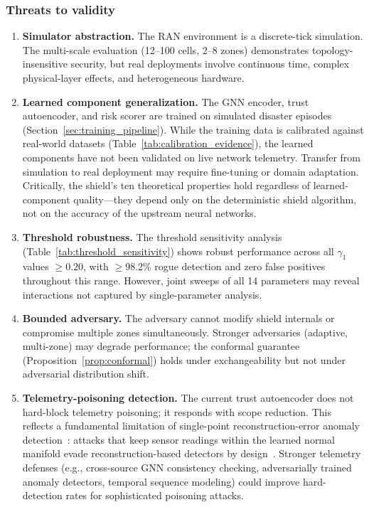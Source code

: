 \documentclass[10pt,journal,compsoc]{IEEEtran}
\begin{document}
\subsubsection{Threats to validity}
\begin{enumerate}
    \item \textbf{Simulator abstraction.}  The RAN environment is a discrete-tick simulation.  The multi-scale evaluation (12--100 cells, 2--8 zones) demonstrates topology-insensitive security, but real deployments involve continuous time, complex physical-layer effects, and heterogeneous hardware.
    \item \textbf{Learned component generalization.}  The GNN encoder, trust autoencoder, and risk scorer are trained on simulated disaster episodes (Section~\ref{sec:training_pipeline}).  While the training data is calibrated against real-world datasets (Table~\ref{tab:calibration_evidence}), the learned components have not been validated on live network telemetry.  Transfer from simulation to real deployment may require fine-tuning or domain adaptation.  Critically, the shield's ten theoretical properties hold regardless of learned-component quality---they depend only on the deterministic shield algorithm, not on the accuracy of the upstream neural networks.
    \item \textbf{Threshold robustness.}  The threshold sensitivity analysis (Table~\ref{tab:threshold_sensitivity}) shows robust performance across all $\gamma_1$ values $\ge 0.20$, with $\ge$98.2\% rogue detection and zero false positives throughout this range.  However, joint sweeps of all 14 parameters may reveal interactions not captured by single-parameter analysis.
    \item \textbf{Bounded adversary.}  The adversary cannot modify shield internals or compromise multiple zones simultaneously.  Stronger adversaries (adaptive, multi-zone) may degrade performance; the conformal guarantee (Proposition~\ref{prop:conformal}) holds under exchangeability but not under adversarial distribution shift.
    \item \textbf{Telemetry-poisoning detection.}  The current trust autoencoder does not hard-block telemetry poisoning; it responds with scope reduction.  This reflects a fundamental limitation of single-point reconstruction-error anomaly detection~\cite{pang2021deep,erba2020constrained}: attacks that keep sensor readings within the learned normal manifold evade reconstruction-based detectors by design~\cite{kravchik2022efficient}.  Stronger telemetry defenses (e.g., cross-source GNN consistency checking, adversarially trained anomaly detectors, temporal sequence modeling) could improve hard-detection rates for sophisticated poisoning attacks.

\end{enumerate}
\end{document}
